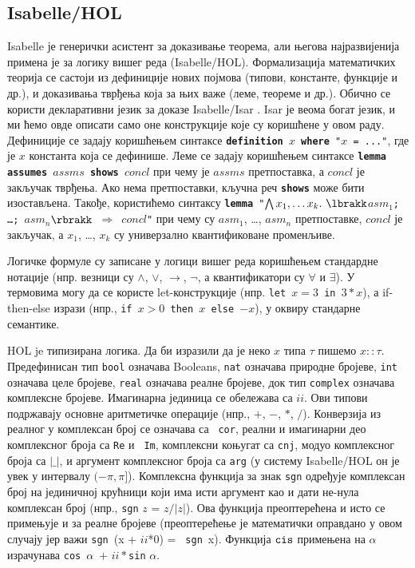 \subsection{Isabelle/HOL}
Isabelle \cite{isabelle} је генерички асистент за доказивање теорема,
али његова најразвијенија примена је за логику вишег реда
(Isabelle/HOL). Формализација математичких теорија се састоји из
дефиниције нових појмова (типови, константе, функције и др.), и
доказивања тврђења која за њих важе (леме, теореме и др.). Обично се
користи декларативни језик за доказе Isabelle/Isar \cite{isar}. Isar
је веома богат језик, и ми ћемо овде описати само оне конструкције
које су коришћене у овом раду. Дефиниције се задају коришћењем
синтаксе {\tt {\bf definition} $x$ {\bf where} "$x$ = ..."}, где је
$x$ константа која се дефинише. Леме се задају коришћењем синтаксе
{\tt {\bf lemma} {\bf assumes} $assms$ {\bf shows} $concl$} при чему
је $assms$ претпоставка, а $concl$ је закључак тврђења. Ако нема
претпоставки, кључна реч {\tt {\bf shows}} може бити
изостављена. Такође, користићемо синтаксу {\tt {\bf lemma} "$\bigwedge
  x_1, \ldots x_k.\ \lbrakk$$asm_1$; \ldots; $asm_n$$\rbrakk$
  $\Longrightarrow$ $concl$"} при чему су $asm_1$, \ldots, $asm_n$
претпоставке, $concl$ је закључак, а $x_1$, \ldots, $x_k$ су
универзално квантификоване променљиве.

Логичке формуле су записане у логици вишег реда коришћењем стандардне
нотације (нпр. везници су $\wedge$, $\vee$, $\longrightarrow$, $\neg$,
а квантификатори су $\forall$ и $\exists$). У термовима могу да се
користе let-конструкције (нпр. {\tt let $x=3$ in $3*x$}), а
if-then-else изрази (нпр., {\tt if $x > 0$ then $x$ else $-x$}), у
оквиру стандарне семантике.

HOL je типизирана логика. Да би изразили да је неко $x$ типа $\tau$
пишемо $x :: \tau$. Предефинисан тип {\tt bool} означава Booleans,
{\tt nat} означава природне бројеве, {\tt int} означава целе бројеве,
{\tt real} означава реалне бројеве, док тип {\tt complex} означава
комплексне бројеве. Имагинарна јединица се обележава са $ii$. Ови
типови подржавају основне аритметичке операције (нпр., $+$, $-$, $*$,
$/$). Конверзија из реалног у комплексан број се означава са {\tt
  cor}, реални и имагинарни део комплексног броја са {\tt Re} и {\tt
  Im}, комплексни коњугат са {\tt cnj}, модуо комплексног броја са
$|\_|$, и аргумент комплексног броја са {\tt arg} (у систему
Isabelle/HOL он је увек у интервалу $(-\pi, \pi]$). Комплексна
функција за знак {\tt sgn} одређује комплексан број на јединичној
крућници који има исти аргумент као и дати не-нула комплексан број
(нпр., {\tt sgn} $z$ = $z / |z|$). Ова функција преоптерећена и исто
се примењује и за реалне бројеве (преоптерећење је математички
оправдано у овом случају јер важи {\tt sgn}\ (x + $ii$*0) = {\tt
sgn}\ x).  Функција ${\tt cis}$ примењена на $\alpha$ израчунава
{\tt cos}\ $\alpha$\ $+$ $ii*${\tt sin} $\alpha$.


